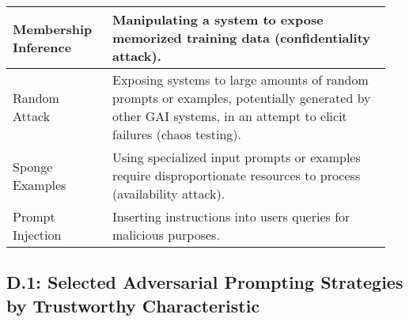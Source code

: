 \documentclass[fleqn]{article}
\begin{document}
\begin{table}[H]
\begin{tabular}{|m{0.25\linewidth}|m{0.70\linewidth}|}
		Membership Inference & Manipulating a system to expose memorized training data (confidentiality attack). \\ \hline
		Random Attack & Exposing systems to large amounts of random prompts or examples, potentially generated by other GAI systems, in an attempt to elicit failures (chaos testing). \\ \hline		
		Sponge Examples & Using specialized input prompts or examples require disproportionate resources to process (availability attack). \\ \hline
		Prompt Injection & Inserting instructions into users queries for malicious purposes. \\ \hline
	\end{tabular}
\end{table}

\pagebreak

\subsection*{D.1: Selected Adversarial Prompting Strategies by Trustworthy Characteristic}\label{sec:appndxd1}
\end{document}
